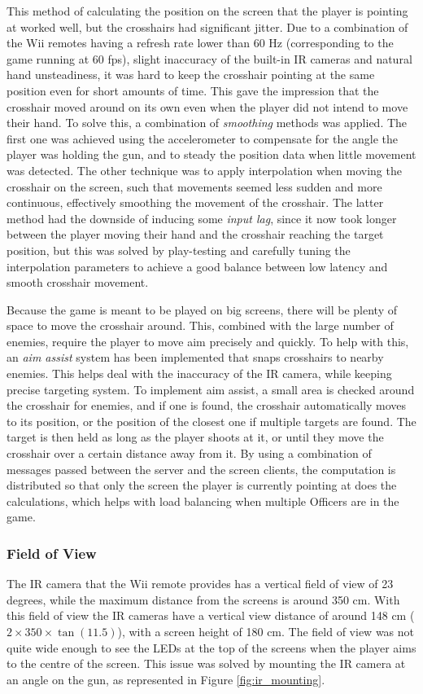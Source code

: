 \documentclass[a4paper,11pt]{article}
\begin{document}
This method of calculating the position on the screen that the player is pointing at worked well, but the crosshairs had significant jitter. Due to a combination of the Wii remotes having a refresh rate lower than 60 Hz (corresponding to the game running at 60 fps), slight inaccuracy of the built-in IR cameras and natural hand unsteadiness, it was hard to keep the crosshair pointing at the same position even for short amounts of time. This gave the impression that the crosshair moved around on its own even when the player did not intend to move their hand. To solve this, a combination of \emph{smoothing} methods was applied. The first one was achieved using the accelerometer to compensate for the angle the player was holding the gun, and to steady the position data when little movement was detected. The other technique was to apply interpolation when moving the crosshair on the screen, such that movements seemed less sudden and more continuous, effectively smoothing the movement of the crosshair. The latter method had the downside of inducing some \emph{input lag}, since it now took longer between the player moving their hand and the crosshair reaching the target position, but this was solved by play-testing and carefully tuning the interpolation parameters to achieve a good balance between low latency and smooth crosshair movement.

Because the game is meant to be played on big screens, there will be plenty of space to move the crosshair around. This, combined with the large number of enemies, require the player to move aim precisely and quickly. To help with this, an \emph{aim assist} system has been implemented that snaps crosshairs to nearby enemies. This helps deal with the inaccuracy of the IR camera, while keeping precise targeting system. To implement aim assist, a small area is checked around the crosshair for enemies, and if one is found, the crosshair automatically moves to its position, or the position of the closest one if multiple targets are found. The target is then held as long as the player shoots at it, or until they move the crosshair over a certain distance away from it. By using a combination of messages passed between the server and the screen clients, the computation is distributed so that only the screen the player is currently pointing at does the calculations, which helps with load balancing when multiple Officers are in the game.

\subsubsection{Field of View}
The IR camera that the Wii remote provides has a vertical field of view of 23 degrees, while the maximum distance from the screens is around 350 cm. With this field of view the IR cameras have a vertical view distance of around 148 cm ($2 \times 350 \times \tan(11.5)$), with a screen height of 180 cm. The field of view was not quite wide enough to see the LEDs at the top of the screens when the player aims to the centre of the screen. This issue was solved by mounting the IR camera at an angle on the gun, as represented in Figure \ref{fig:ir_mounting}.
\end{document}
